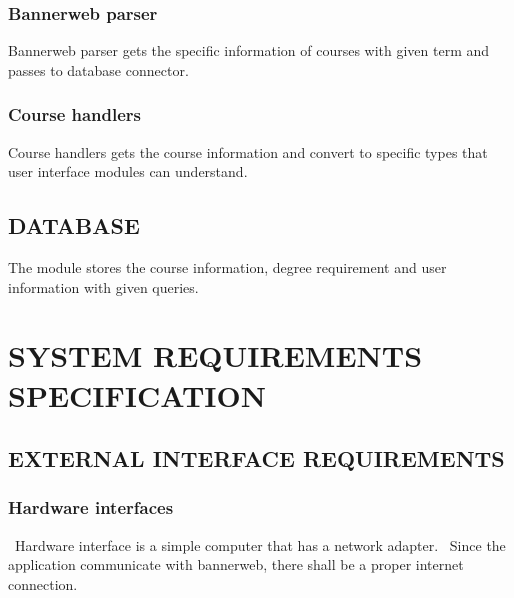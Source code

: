 \documentclass[twoside,letterpaper]{article}
\begin{document}
\subsubsection[Bannerweb parser]{\rmfamily\bfseries\color{black}
Bannerweb parser}
{\color{black}
{Bannerweb parser gets the specific information of courses with given term and passes to database connector.}}

\subsubsection[Course handlers]{\rmfamily\bfseries\color{black}
Course handlers}
{\color{black}
{Course handlers gets the course information and convert to specific types that user interface modules can understand.}}

\subsection[DATABASE]{\rmfamily\bfseries\color{black}
DATABASE}
{\color{black}
{The module stores the course information, degree requirement and user information with given queries.}}



\clearpage\section[SYSTEM REQUIREMENTS SPECIFICATION]{\rmfamily\bfseries\color{black}
SYSTEM REQUIREMENTS SPECIFICATION}


\subsection[EXTERNAL INTERFACE
REQUIREMENTS]{\rmfamily\bfseries\color{black}
EXTERNAL INTERFACE REQUIREMENTS}

\subsubsection[Hardware
interfaces]{\rmfamily\bfseries\color{black}
Hardware interfaces}
{\color{black}
\foreignlanguage{english}{\ }\foreignlanguage{english}{Hardware interface is a simple computer that has a network adapter. \ Since the application communicate with bannerweb, there shall be a proper internet connection.}}
\end{document}
